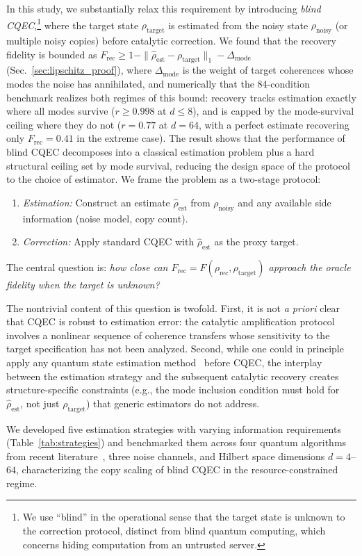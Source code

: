 \documentclass[a4paper,onecolumn]{quantumarticle}
\newcommand{\Frec}{F_\mathrm{rec}}
\newcommand{\rhot}{\rho_\mathrm{target}}
\newcommand{\rhon}{\rho_\mathrm{noisy}}
\newcommand{\rhor}{\rho_\mathrm{rec}}
\newcommand{\rhoe}{\hat{\rho}_\mathrm{est}}
\begin{document}
In this study, we substantially relax this requirement by introducing \emph{blind CQEC},\footnote{We use ``blind'' in the operational sense that the target state is unknown to the correction protocol, distinct from blind quantum computing, which concerns hiding computation from an untrusted server.} where the target state $\rhot$ is estimated from the noisy state $\rhon$ (or multiple noisy copies) before catalytic correction.
We found that the recovery fidelity is bounded as $\Frec \geq 1 - \|\rhoe - \rhot\|_1 - \Delta_\mathrm{mode}$ (Sec.~\ref{sec:lipschitz_proof}), where $\Delta_\mathrm{mode}$ is the weight of target coherences whose modes the noise has annihilated, and numerically that the 84-condition benchmark realizes both regimes of this bound: recovery tracks estimation exactly where all modes survive ($r \geq 0.998$ at $d \leq 8$), and is capped by the mode-survival ceiling where they do not ($r = 0.77$ at $d = 64$, with a perfect estimate recovering only $\Frec = 0.41$ in the extreme case).
The result shows that the performance of blind CQEC decomposes into a classical estimation problem plus a hard structural ceiling set by mode survival, reducing the design space of the protocol to the choice of estimator.
We frame the problem as a two-stage protocol:
\begin{enumerate}
\item \emph{Estimation:} Construct an estimate $\rhoe$ from $\rhon$ and any available side information (noise model, copy count).
\item \emph{Correction:} Apply standard CQEC with $\rhoe$ as the proxy target.
\end{enumerate}
The central question is: \emph{how close can $\Frec = F(\rhor, \rhot)$ approach the oracle fidelity when the target is unknown?}

The nontrivial content of this question is twofold.
First, it is not \emph{a priori} clear that CQEC is robust to estimation error: the catalytic amplification protocol involves a nonlinear sequence of coherence transfers whose sensitivity to the target specification has not been analyzed.
Second, while one could in principle apply any quantum state estimation method~\cite{Hradil1997,Gross2010,Haah2017} before CQEC, the interplay between the estimation strategy and the subsequent catalytic recovery creates structure-specific constraints (e.g., the mode inclusion condition must hold for $\rhoe$, not just $\rhot$) that generic estimators do not address.

We developed five estimation strategies with varying information requirements (Table~\ref{tab:strategies}) and benchmarked them across four quantum algorithms from recent literature~\cite{Chen2021,Ivashkov2024,Clinton2026,Regev2024}, three noise channels, and Hilbert space dimensions $d = 4$--$64$, characterizing the copy scaling of blind CQEC in the resource-constrained regime.
\end{document}
